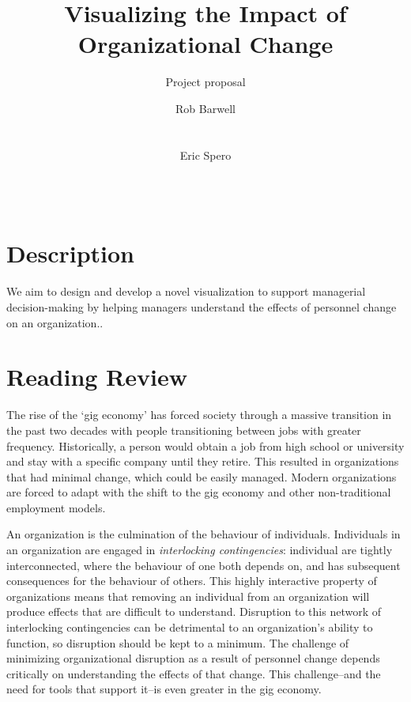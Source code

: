 \documentclass{soups}
\title{Visualizing the Impact of Organizational Change}
\subtitle{Project proposal}
\author{
\alignauthor
Rob Barwell\\ %
       \affaddr{Carleton University}\\
       \affaddr{Ottawa, Canada}\\
       \email{rob@barwell.ca}
\alignauthor
Eric Spero\\ %
       \affaddr{Carleton University}\\
       \affaddr{Ottawa, Canada }\\
       \email{eric.spero@carleton.ca}
}
\begin{document}
\nobalance

\makeatletter
\def\@copyrightspace{\relax}
\makeatother

\maketitle

\section{Description}

We aim to design and develop a novel visualization to support managerial decision-making by helping managers understand the effects of personnel change on an organization..

\section{Reading Review}

The rise of the \lq gig economy\rq{}\cite{de2015rise,friedman2014workers} has forced society through a massive transition in the past two decades with people transitioning between jobs with greater frequency.  Historically, a person would obtain a job from high school or university and stay with a specific company until they retire.  This resulted in organizations that had minimal change, which could be easily managed. Modern organizations are forced to adapt with the shift to the gig economy and other non-traditional employment models.  

An organization is the culmination of the behaviour of individuals. Individuals in an organization are engaged in \emph{interlocking contingencies}\cite{glenn2006complexity}: individual are tightly interconnected, where the behaviour of one both depends on, and has subsequent consequences for the behaviour of others\cite{glenn2006complexity}. This highly interactive property of organizations means that removing an individual from an organization will produce effects that are difficult to understand. Disruption to this network of interlocking contingencies can be detrimental to an organization's ability to function, so disruption should be kept to a minimum. The challenge of minimizing organizational disruption as a result of personnel change depends critically on understanding the effects of that change. This challenge--and the need for tools that support it--is even greater in the gig economy. 
\end{document}
